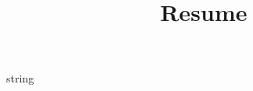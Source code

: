 \documentclass{article}%
\title{Resume}%
\date{}%
\begin{document}
%
\normalsize%
\maketitle%
string%
\end{document}
